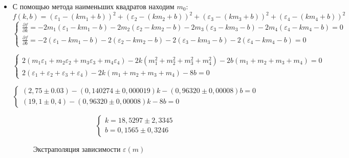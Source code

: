 \documentclass{article}
\begin{document}
\begin{itemize}
\begin{itemize}
\item С помощью метода наименьших квадратов находим $m_0$:
$$ f(k, b)=\left( \varepsilon_1-(km_1+b)\right) ^2+\left( \varepsilon_2-(km_2+b)\right) ^2+\left( \varepsilon_3-(km_3+b)\right) ^2+\left( \varepsilon_4-(km_4+b)\right) ^2$$
\begin{equation*}
	\begin{cases}
		\frac{\partial f}{\partial k}=-2m_1( \varepsilon_1-km_1-b) - 2m_2( \varepsilon_2-km_2-b) - 2m_3( \varepsilon_3-km_3-b) - 2m_4( \varepsilon_4-km_4-b) =0\\
		\frac{\partial f}{\partial b}=-2( \varepsilon_1-km_1-b) - 2( \varepsilon_2-km_2-b) - 2( \varepsilon_3-km_3-b) - 2( \varepsilon_4-km_4-b) =0
		
	\end{cases}
\end{equation*}

\begin{equation*}
	\begin{cases}
		2(m_1\varepsilon_1+m_2\varepsilon_2+m_3\varepsilon_3+m_4\varepsilon_4)-2k(m_1^2+m_2^2+m_3^2+m_4^2)-2b(m_1+m_2+m_3+m_4)=0\\
		2(\varepsilon_1 + \varepsilon_2 + \varepsilon_3 + \varepsilon_4)-2k(m_1+m_2+m_3+m_4)-8b=0
	\end{cases}
\end{equation*}

\begin{equation*}
	\begin{cases}
		(2,75\pm0.03)-(0,140274\pm0,000019)k-(0,96320\pm0,00008)b=0\\
		(19,1\pm0,4)-(0,96320\pm0,00008)k-8b=0
	\end{cases}
\end{equation*}

\begin{equation*}
	\begin{cases}
	k = 18,5297\pm2,3345\\
	b=0,1565\pm0,3246
\end{cases}
\end{equation*}

\begin{figure}[!htb]
	\centering
	\caption{Экстраполяция зависимости $\varepsilon(m)$}
\end{figure}


\end{itemize}
\end{itemize}
\end{document}
